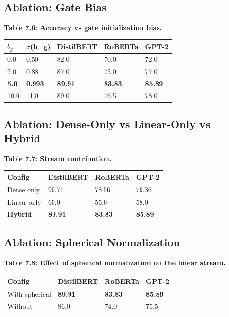 \subsection{Ablation: Gate Bias}

\textbf{Table 7.6: Accuracy vs gate initialization bias.}

\begin{table}[H]
\centering
\small
\begin{tabular}{lllll}
\toprule
\textbf{$b_g$} & \textbf{$\sigma$(b\_g)} & \textbf{DistilBERT} & \textbf{RoBERTa} & \textbf{GPT-2} \\
\midrule
0.0 & 0.50 & 82.0 & 70.0 & 72.0 \\
2.0 & 0.88 & 87.0 & 75.0 & 77.0 \\
\textbf{5.0} & \textbf{0.993} & \textbf{89.91} & \textbf{83.83} & \textbf{85.89} \\
10.0 & ~1.0 & 89.0 & 76.5 & 78.0 \\
\bottomrule
\end{tabular}
\end{table}

\subsection{Ablation: Dense-Only vs Linear-Only vs Hybrid}

\textbf{Table 7.7: Stream contribution.}

\begin{table}[H]
\centering
\small
\begin{tabular}{llll}
\toprule
\textbf{Config} & \textbf{DistilBERT} & \textbf{RoBERTa} & \textbf{GPT-2} \\
\midrule
Dense only & 90.71 & 78.56 & 79.36 \\
Linear only & 60.0 & 55.0 & 58.0 \\
\textbf{Hybrid} & \textbf{89.91} & \textbf{83.83} & \textbf{85.89} \\
\bottomrule
\end{tabular}
\end{table}

\subsection{Ablation: Spherical Normalization}

\textbf{Table 7.8: Effect of spherical normalization on the linear stream.}

\begin{table}[H]
\centering
\small
\begin{tabular}{llll}
\toprule
\textbf{Config} & \textbf{DistilBERT} & \textbf{RoBERTa} & \textbf{GPT-2} \\
\midrule
With spherical & \textbf{89.91} & \textbf{83.83} & \textbf{85.89} \\
Without & 86.0 & 74.0 & 75.5 \\
\bottomrule
\end{tabular}
\end{table}

